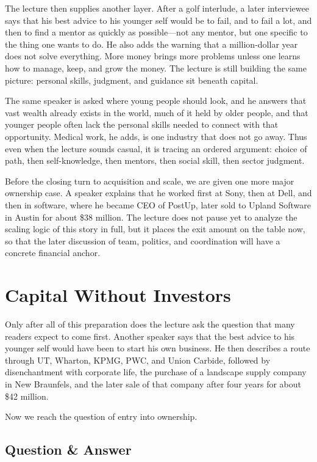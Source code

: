 The lecture then supplies another layer. After a golf interlude, a later interviewee says that his best advice to his younger self would be to fail, and to fail a lot, and then to find a mentor as quickly as possible---not any mentor, but one specific to the thing one wants to do. He also adds the warning that a million-dollar year does not solve everything. More money brings more problems unless one learns how to manage, keep, and grow the money. The lecture is still building the same picture: personal skills, judgment, and guidance sit beneath capital.

The same speaker is asked where young people should look, and he answers that vast wealth already exists in the world, much of it held by older people, and that younger people often lack the personal skills needed to connect with that opportunity. Medical work, he adds, is one industry that does not go away. Thus even when the lecture sounds casual, it is tracing an ordered argument: choice of path, then self-knowledge, then mentors, then social skill, then sector judgment.

Before the closing turn to acquisition and scale, we are given one more major ownership case. A speaker explains that he worked first at Sony, then at Dell, and then in software, where he became CEO of PostUp, later sold to Upland Software in Austin for about \$38 million. The lecture does not pause yet to analyze the scaling logic of this story in full, but it places the exit amount on the table now, so that the later discussion of team, politics, and coordination will have a concrete financial anchor.

\section{Capital Without Investors}

Only after all of this preparation does the lecture ask the question that many readers expect to come first. Another speaker says that the best advice to his younger self would have been to start his own business. He then describes a route through UT, Wharton, KPMG, PWC, and Union Carbide, followed by disenchantment with corporate life, the purchase of a landscape supply company in New Braunfels, and the later sale of that company after four years for about \$42 million.

Now we reach the question of entry into ownership.

\subsection{Question \& Answer}

